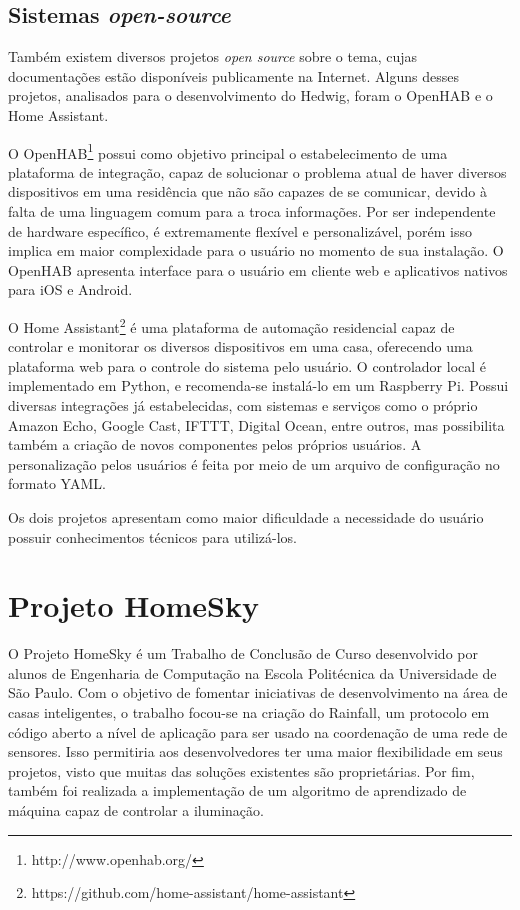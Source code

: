 \subsection{Sistemas \emph{open-source}}
Também existem diversos projetos \textit{open source} sobre o tema, cujas documentações estão disponíveis publicamente na Internet. Alguns desses projetos, analisados para o desenvolvimento do Hedwig, foram o OpenHAB e o Home Assistant.

O OpenHAB\footnote{http://www.openhab.org/} possui como objetivo principal o estabelecimento de uma plataforma de integração, capaz de solucionar o problema atual de haver diversos dispositivos em uma residência que não são capazes de se comunicar, devido à falta de uma linguagem comum para a troca informações. Por ser independente de hardware específico, é extremamente flexível e personalizável, porém isso implica em maior complexidade para o usuário no momento de sua instalação. O OpenHAB apresenta interface para o usuário em cliente web e aplicativos nativos para iOS e Android.

O Home Assistant\footnote{https://github.com/home-assistant/home-assistant} é uma plataforma de automação residencial capaz de controlar e monitorar os diversos dispositivos em uma casa, oferecendo uma plataforma web para o controle do sistema pelo usuário. O controlador local é implementado em Python, e recomenda-se instalá-lo em um Raspberry Pi. Possui diversas integrações já estabelecidas, com sistemas e serviços como o próprio Amazon Echo, Google Cast, IFTTT, Digital Ocean, entre outros, mas possibilita também a criação de novos componentes pelos próprios usuários. A personalização pelos usuários é feita por meio de um arquivo de configuração no formato YAML.

Os dois projetos apresentam como maior dificuldade a necessidade do usuário possuir conhecimentos técnicos para utilizá-los.

\section{Projeto HomeSky}

O Projeto HomeSky \cite{homeSky} é um Trabalho de Conclusão de Curso desenvolvido por alunos de Engenharia de Computação na Escola Politécnica da Universidade de São Paulo. Com o objetivo de fomentar iniciativas de desenvolvimento na área de casas inteligentes, o trabalho focou-se na criação do Rainfall, um protocolo em código aberto a nível de aplicação para ser usado na coordenação de uma rede de sensores. Isso permitiria aos desenvolvedores ter uma maior flexibilidade em seus projetos, visto que muitas das soluções existentes são proprietárias. Por fim, também foi realizada a implementação de um algoritmo de aprendizado de máquina capaz de controlar a iluminação.

